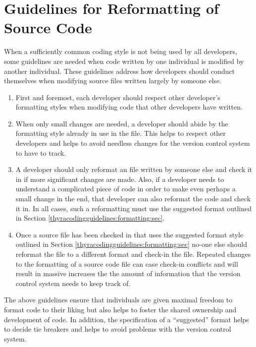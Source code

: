 %
\section{Guidelines for Reformatting of Source Code}
%

When a sufficiently common coding style is not being used by all developers,
some guidelines are needed when code written by one individual is modified by
another individual.  These guidelines address how developers should conduct
themselves when modifying source files written largely by someone else.

\begin{enumerate}

{}\item First and foremost, each developer should respect other developer's
formatting styles when modifying code that other developers have written.

{}\item When only small changes are needed, a developer should abide by the
formatting style already in use in the file.  This helps to respect other
developers and helps to avoid needless changes for the version control system
to have to track.

{}\item A developer should only reformat an file written by someone else and
check it in if more significant changes are made.  Also, if a developer needs
to understand a complicated piece of code in order to make even perhaps a
small change in the end, that developer can also reformat the code and check
it in.  In all cases, such a reformatting must use the suggested format
outlined in Section {}\ref{thyracodingguidelines:formatting:sec}.

{}\item Once a source file has been checked in that uses the suggested format
style outlined in Section {}\ref{thyracodingguidelines:formatting:sec} no-one
else should reformat the file to a different format and check-in the file.
Repeated changes to the formatting of a source code file can case check-in
conflicts and will result in massive increases the the amount of information
that the version control system needs to keep track of.

\end{enumerate}

The above guidelines ensure that individuals are given maximal freedom to
format code to their liking but also helps to foster the shared ownership and
development of code.  In addition, the specification of a ``suggested'' format
helps to decide tie breakers and helps to avoid problems with the version
control system.
